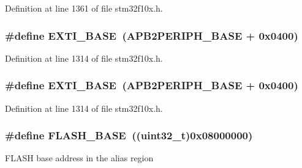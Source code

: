 Definition at line 1361 of file stm32f10x.\+h.

\subsubsection[{\texorpdfstring{E\+X\+T\+I\+\_\+\+B\+A\+SE}{EXTI_BASE}}]{\setlength{\rightskip}{0pt plus 5cm}\#define E\+X\+T\+I\+\_\+\+B\+A\+SE~({\bf A\+P\+B2\+P\+E\+R\+I\+P\+H\+\_\+\+B\+A\+SE} + 0x0400)}\hypertarget{group___peripheral__memory__map_ga87371508b3bcdcd98cd1ec629be29061}{}\label{group___peripheral__memory__map_ga87371508b3bcdcd98cd1ec629be29061}


Definition at line 1314 of file stm32f10x.\+h.

\subsubsection[{\texorpdfstring{E\+X\+T\+I\+\_\+\+B\+A\+SE}{EXTI_BASE}}]{\setlength{\rightskip}{0pt plus 5cm}\#define E\+X\+T\+I\+\_\+\+B\+A\+SE~({\bf A\+P\+B2\+P\+E\+R\+I\+P\+H\+\_\+\+B\+A\+SE} + 0x0400)}\hypertarget{group___peripheral__memory__map_ga87371508b3bcdcd98cd1ec629be29061}{}\label{group___peripheral__memory__map_ga87371508b3bcdcd98cd1ec629be29061}


Definition at line 1314 of file stm32f10x.\+h.

\subsubsection[{\texorpdfstring{F\+L\+A\+S\+H\+\_\+\+B\+A\+SE}{FLASH_BASE}}]{\setlength{\rightskip}{0pt plus 5cm}\#define F\+L\+A\+S\+H\+\_\+\+B\+A\+SE~(({\bf uint32\+\_\+t})0x08000000)}\hypertarget{group___peripheral__memory__map_ga23a9099a5f8fc9c6e253c0eecb2be8db}{}\label{group___peripheral__memory__map_ga23a9099a5f8fc9c6e253c0eecb2be8db}
F\+L\+A\+SH base address in the alias region 

